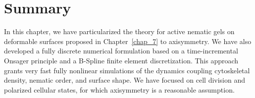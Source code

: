 {%
%




\section{Summary}

In this chapter, we have particularized the theory for active nematic gels on deformable surfaces proposed in Chapter~\ref{chap_7} to axisymmetry. We have also developed a fully discrete numerical formulation based on a time-incremental Onsager principle and a B-Spline finite element discretization. This approach grants very fast fully nonlinear simulations of the dynamics coupling  cytoskeletal density, nematic order, and surface shape. We have focused on cell division and polarized cellular states, for which axisymmetry is a reasonable assumption.

}
